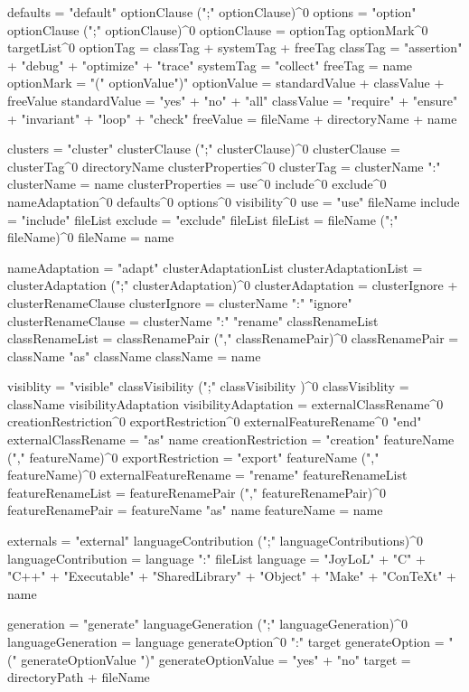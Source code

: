 defaults = "default" optionClause (";" optionClause)^0
options  = "option" optionClause (";" optionClause)^0
optionClause = optionTag optionMark^0 targetList^0
optionTag    = classTag + systemTag + freeTag
classTag     = "assertion" + "debug" + "optimize" + "trace"
systemTag    = "collect"
freeTag      = name
optionMark   = "(" optionValue")"
optionValue  = standardValue + classValue + freeValue
standardValue = "yes" + "no" + "all"
classValue    = "require" + "ensure" + "invariant" + "loop" + "check"
freeValue     = fileName + directoryName + name

clusters = "cluster" clusterClause (";" clusterClause)^0
clusterClause = clusterTag^0 directoryName clusterProperties^0
clusterTag    = clusterName ":"
clusterName   = name
clusterProperties = use^0
  include^0
  exclude^0
  nameAdaptation^0
  defaults^0
  options^0
  visibility^0
use = "use" fileName
include = "include" fileList
exclude = "exclude" fileList
fileList = fileName (";" fileName)^0
fileName = name

nameAdaptation = "adapt" clusterAdaptationList
clusterAdaptationList = clusterAdaptation (";" clusterAdaptation)^0
clusterAdaptation = clusterIgnore + clusterRenameClause
clusterIgnore = clusterName ":" "ignore"
clusterRenameClause = clusterName ":" "rename" classRenameList
classRenameList = classRenamePair ("," classRenamePair)^0
classRenamePair = className "as" className
className = name

visiblity = "visible" classVisibility (";" classVisibility )^0
classVisiblity = className visibilityAdaptation
visibilityAdaptation = externalClassRename^0
  creationRestriction^0
  exportRestriction^0
  externalFeatureRename^0
  "end"
externalClassRename = "as" name
creationRestriction = "creation" featureName ("," featureName)^0
exportRestriction = "export" featureName ("," featureName)^0
externalFeatureRename = "rename" featureRenameList
featureRenameList = featureRenamePair ("," featureRenamePair)^0
featureRenamePair = featureName "as" name
featureName = name

externals = "external" languageContribution (";" languageContributions)^0
languageContribution = language ":" fileList
language = "JoyLoL" +
  "C" + "C++" +
  "Executable" + "SharedLibrary" + 
  "Object" +
  "Make" +
  "ConTeXt" +
  name

generation = "generate" languageGeneration (";" languageGeneration)^0
languageGeneration = language generateOption^0 ":" target
generateOption = "(" generateOptionValue ")"
generateOptionValue = "yes" + "no"
target = directoryPath + fileName

